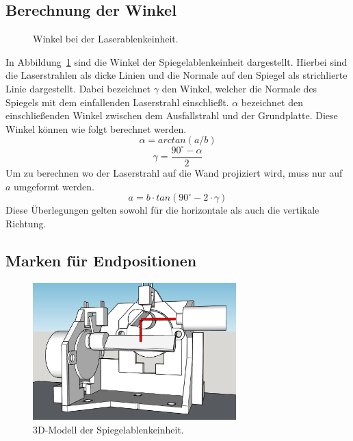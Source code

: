 \subsection{Berechnung der Winkel}
\begin{figure}[!h] \centering
	
	\caption{Winkel bei der Laserablenkeinheit.}
	\label{fig:angles}
\end{figure}

In Abbildung~\ref{fig:angles} sind die Winkel der Spiegelablenkeinheit dargestellt.
Hierbei sind die Laserstrahlen als dicke Linien und die Normale auf den Spiegel als strichlierte Linie dargestellt.
Dabei bezeichnet $\gamma$ den Winkel, welcher die Normale des Spiegels mit dem einfallenden Laserstrahl einschließt.
$\alpha$ bezeichnet den einschließenden Winkel zwischen dem Ausfallstrahl und der Grundplatte.
Diese Winkel können wie folgt berechnet werden.
\begin{equation}
\alpha=arctan(a/b)
\end{equation}
\begin{equation}
\gamma=\frac{90^\circ-\alpha}{2}
\end{equation}
Um zu berechnen wo der Laserstrahl auf die Wand projiziert wird, muss nur auf $a$ umgeformt werden.
\begin{equation} \label{equ:posOfLaser}
a=b \cdot tan(90^\circ-2 \cdot \gamma)
\end{equation}
Diese Überlegungen gelten sowohl für die horizontale als auch die vertikale Richtung.


\subsection{Marken für Endpositionen}

\begin{figure}[!h] \centering
	\includegraphics[width=0.7\textwidth]{img/Sketchup/Lasercontroll00.PNG}
	\caption{3D-Modell der Spiegelablenkeinheit.}
	\label{fig:laserablenkeinheit}
\end{figure}

